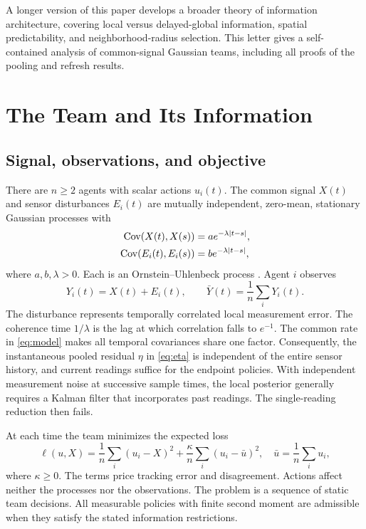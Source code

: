 \documentclass[letterpaper,10pt,conference]{ieeeconf}
\newcommand{\Cov}{\operatorname{Cov}}
\begin{document}
A longer version of this paper \cite{tina2026} develops a broader theory of information architecture, covering local versus delayed-global information, spatial predictability, and neighborhood-radius selection. This letter gives a self-contained analysis of common-signal Gaussian teams, including all proofs of the pooling and refresh results.

\section{The Team and Its Information}
\subsection{Signal, observations, and objective}
There are $n\ge2$ agents with scalar actions $u_i(t)$. The common signal $X(t)$ and sensor disturbances $E_i(t)$ are mutually independent, zero-mean, stationary Gaussian processes with
\begin{align}
 \Cov(X(t),X(s))&=a e^{-\lambda|t-s|},\notag\\
 \Cov(E_i(t),E_i(s))&=b e^{-\lambda|t-s|},\label{eq:model}
\end{align}
where $a,b,\lambda>0$. Each is an Ornstein--Uhlenbeck process \cite{uhlenbeck1930brownian}. Agent $i$ observes
\begin{equation}
 Y_i(t)=X(t)+E_i(t),\qquad \bar Y(t)=\frac1n\sum_iY_i(t).
 \label{eq:observations}
\end{equation}
The disturbance represents temporally correlated local measurement error. The coherence time $1/\lambda$ is the lag at which correlation falls to $e^{-1}$. The common rate in \eqref{eq:model} makes all temporal covariances share one factor. Consequently, the instantaneous pooled residual $\eta$ in \eqref{eq:eta} is independent of the entire sensor history, and current readings suffice for the endpoint policies. With independent measurement noise at successive sample times, the local posterior generally requires a Kalman filter that incorporates past readings. The single-reading reduction then fails.

At each time the team minimizes the expected loss
\begin{equation}
 \ell(u,X)=\frac1n\sum_i(u_i-X)^2
       +\frac\kappa n\sum_i(u_i-\bar u)^2,
 \quad \bar u=\frac1n\sum_i u_i,\label{eq:loss}
\end{equation}
where $\kappa\ge0$. The terms price tracking error and disagreement. Actions affect neither the processes nor the observations. The problem is a sequence of static team decisions. All measurable policies with finite second moment are admissible when they satisfy the stated information restrictions.
\end{document}
